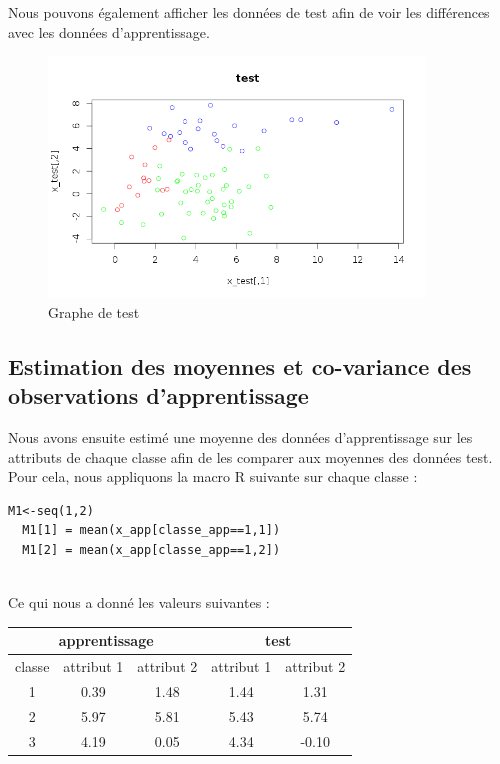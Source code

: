 \documentclass[a4paper,11pt]{article}
\begin{document}
  Nous pouvons également afficher les données de test afin de voir les différences avec les données d'apprentissage.
  \newpage
  \begin{figure}[h]
   \center
   \includegraphics[width=10cm]{ensemble_test.png}
   \caption{Graphe de test}
  \end{figure}
   
  \subsection{Estimation des moyennes et co-variance des observations d'apprentissage}
  Nous avons ensuite estimé une moyenne des données d'apprentissage sur les attributs de chaque classe afin de les
  comparer aux moyennes des données test. Pour cela, nous appliquons la macro R suivante sur chaque classe :
  
  \begin{lstlisting}[caption=Estimation de la moyenne pour la classe d'apprentissage 1]
  M1<-seq(1,2)
  M1[1] = mean(x_app[classe_app==1,1])
  M1[2] = mean(x_app[classe_app==1,2])
  \end{lstlisting}
  \ \\
  Ce qui nous a donné les valeurs suivantes :\\
  
  \begin{center}
    \begin{tabular}{|c|c|c|c|c|}
    \hline
    \multicolumn{3}{|c|}{apprentissage} & \multicolumn{2}{c|}{test}\\
    \hline
    classe & attribut 1 & attribut 2 & attribut 1 & attribut 2\\
    \hline
    1 & 0.39 & 1.48 & 1.44 & 1.31\\
    \hline
    2 & 5.97 & 5.81 & 5.43 & 5.74\\
    \hline
    3 & 4.19 & 0.05 & 4.34 & -0.10\\
    \hline
    \end{tabular}
  \end{center}
  
\end{document}
